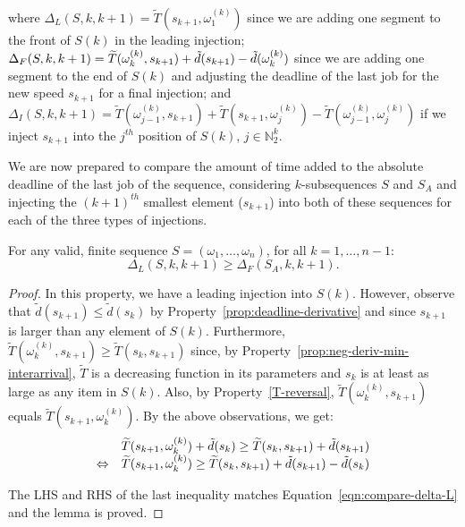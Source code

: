 \noindent where $\Delta_L (S, k, k+1) = \widetilde{T}(s_{k+1},\omega^{(k)}_1)$ since we are adding one segment to the front of $S(k)$ in the leading injection;   $\Delta_F (S, k, k+1) = \widetilde{T}(\omega^{(k)}_k, s_{k+1}) + \Tilde{d}(s_{k+1}) - \Tilde{d}(\omega^{(k)}_k)$ since we are adding one segment to the end of $S(k)$ and adjusting the deadline of the last job for the new speed $s_{k+1}$ for a final injection; and $\Delta_I (S, k, k+1) = \widetilde{T}(\omega^{(k)}_{j-1}, s_{k+1}) + \widetilde{T}(s_{k+1}, \omega^{(k)}_{j}) - \widetilde{T}(\omega^{(k)}_{j-1}, \omega^{(k)}_{j})$ if we inject $s_{k+1}$ into the $j^{th}$ position of $S(k)$, $j\in\mathbb{N}_2^{k}$.

We are now prepared to compare the amount of time added to the absolute deadline of the last job of the sequence, considering $k$-subsequences $S$ and $S_A$ and injecting the $(k+1)^{th}$ smallest element ($s_{k+1}$) into both of these sequences for each of the three types of injections.

\begin{property}\label{prop:ascending-dominates-L}
For any valid, finite sequence $S = (\omega_1, \ldots, \omega_n)$, for all $k = 1, \ldots, n-1$:
\begin{equation}\label{eqn:compare-delta-L}
    \Delta_L(S,k,k+1) \geq \Delta_F(S_A, k, k+1).
\end{equation}
\end{property}
\begin{proof}
In this property, we have a leading injection into $S(k)$.  However, observe that $\widetilde{d}(s_{k+1}) \leq \widetilde{d}({s_k})$ by Property~\ref{prop:deadline-derivative} and since $s_{k+1}$ is larger than any element of $S(k)$.  Furthermore, $\widetilde{T}(\omega^{(k)}_k, s_{k+1}) \geq \widetilde{T}(s_k, s_{k+1})$ since, by Property~\ref{prop:neg-deriv-min-interarrival}, $\widetilde{T}$ is a decreasing function in its parameters and $s_k$ is at least as large as any item in $S(k)$.  Also, by Property~\ref{T-reversal}, $\widetilde{T}(\omega^{(k)}_k, s_{k+1})$ equals $\widetilde{T}(s_{k+1}, \omega^{(k)}_k)$.  By the above observations, we get:
\begin{equation}\label{eq:FEIdominatesLEI}
\begin{array}{ll}                  
    & \widetilde{T}(s_{k+1}, \omega^{(k)}_k) +\Tilde{d}(s_k) \geq \widetilde{T}(s_k, s_{k+1})+\Tilde{d}(s_{k+1})\nonumber\\
    \Leftrightarrow & \widetilde{T}(s_{k+1}, \omega^{(k)}_k) \geq \widetilde{T}(s_k, s_{k+1})+\Tilde{d}(s_{k+1})- \Tilde{d}(s_k)\nonumber
\end{array}
\end{equation}

The LHS and RHS of the last inequality matches  Equation~\ref{eqn:compare-delta-L} and the lemma is proved.
\end{proof}



